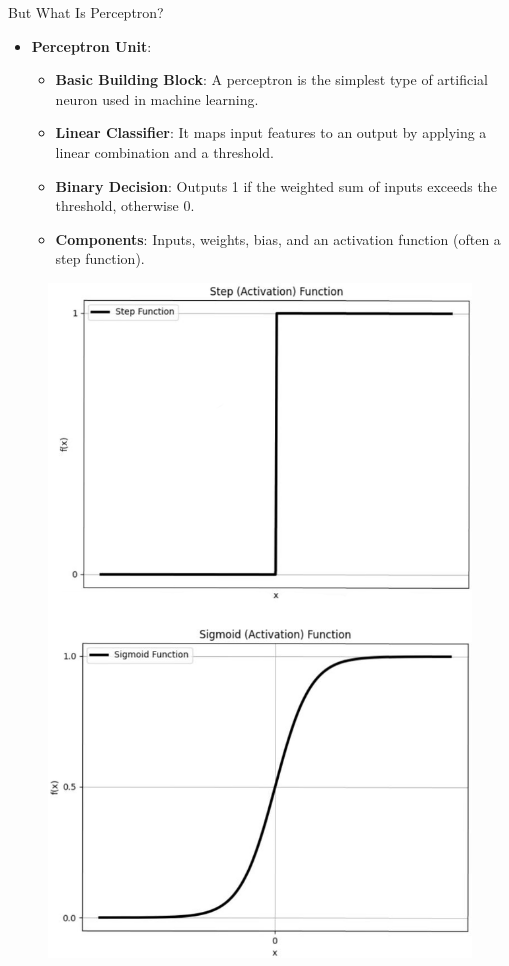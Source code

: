 \documentclass[serif, aspectratio=169]{beamer}
\begin{document}
\begin{frame}{But What Is Perceptron?}
    \begin{itemize}
        \item \textbf{Perceptron Unit}:
        \medskip
        \begin{itemize}\itemsep1em
        \item \justifying \textbf{Basic Building Block}:
        A perceptron is the simplest type of artificial neuron used in machine learning.
        \item \justifying \textbf{Linear Classifier}:
        It maps input features to an output by applying a linear combination and a threshold.
        \item \justifying \textbf{Binary Decision}:
        Outputs 1 if the weighted sum of inputs exceeds the threshold, otherwise 0.
        \item \justifying \textbf{Components}:
        Inputs, weights, bias, and an activation function (often a step function).
        \end{itemize}
    \end{itemize}
    \endminipage
    \hfill
    \begin{figure}
        \centering
        \includegraphics[width=.6\linewidth]{pic/Figure_17.png}
    \end{figure}
    \begin{figure}

\end{figure}
\end{frame}
\end{document}

